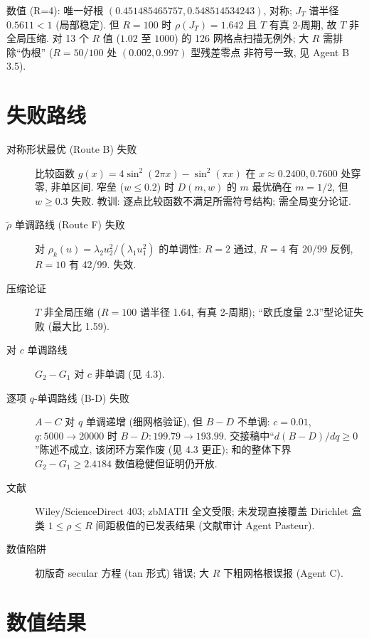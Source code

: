 \documentclass[UTF8]{ctexart}
\begin{document}
数值 (R=4): 唯一好根 $(0.451485465757, 0.548514534243)$, 对称;
$J_T$ 谱半径 $0.5611 < 1$ (局部稳定). 但 $R=100$ 时
$\rho(J_T)=1.642$ 且 $T$ 有真 2-周期, 故 $T$ 非全局压缩.
对 13 个 $R$ 值 ($1.02$ 至 $1000$) 的 126 网格点扫描无例外; 大 $R$ 需排除``伪根'' ($R=50/100$ 处 $(0.002,0.997)$ 型残差零点
非符号一致, 见 Agent B 3.5).

\section{失败路线}

\begin{description}
	\item[对称形状最优 (Route B) 失败] 比较函数 $g(x)=4\sin^2(2\pi x)-\sin^2(\pi x)$
		在 $x\approx0.2400, 0.7600$ 处穿零, 非单区间. 窄垒 ($w\le0.2$)
		时 $D(m,w)$ 的 $m$ 最优确在 $m=1/2$, 但 $w\ge0.3$ 失败.
		教训: 逐点比较函数不满足所需符号结构; 需全局变分论证.
	\item[$\tilde\rho$ 单调路线 (Route F) 失败] 对
		$\rho_k(u)=\lambda_2u_2^2/(\lambda_1u_1^2)$ 的单调性:
		$R=2$ 通过, $R=4$ 有 20/99 反例, $R=10$ 有 42/99. 失效.
	\item[压缩论证] $T$ 非全局压缩 ($R=100$ 谱半径 1.64, 有真 2-周期);
		``欧氏度量 2.3''型论证失败 (最大比 1.59).
	\item[对 $c$ 单调路线] $G_2-G_1$ 对 $c$ 非单调 (见 4.3).
	\item[逐项 $q$-单调路线 (B-D) 失败] $A-C$ 对 $q$ 单调递增 (细网格验证),
		但 $B-D$ 不单调: $c=0.01$, $q\colon5000\to20000$ 时 $B-D\colon199.79\to193.99$.
		交接稿中``$d(B-D)/dq\ge0$''陈述不成立, 该闭环方案作废 (见 4.3 更正);
		和的整体下界 $G_2-G_1\ge2.4184$ 数值稳健但证明仍开放.
	\item[文献] Wiley/ScienceDirect 403; zbMATH 全文受限; 未发现直接覆盖
		Dirichlet 盒类 $1\le\rho\le R$ 间距极值的已发表结果 (文献审计 Agent Pasteur).
	\item[数值陷阱] 初版奇 secular 方程 (tan 形式) 错误;
		大 $R$ 下粗网格根误报 (Agent C).
\end{description}

\section{数值结果}
\end{document}
